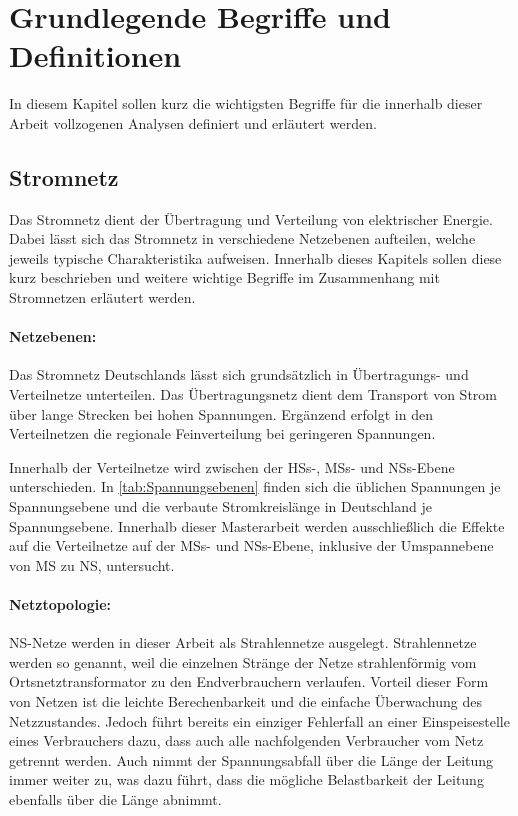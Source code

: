 \section{Grundlegende Begriffe und Definitionen}\label{chap:base_theo}

In diesem Kapitel sollen kurz die wichtigsten Begriffe für die innerhalb dieser Arbeit vollzogenen Analysen definiert und erläutert werden.


\subsection{Stromnetz}

Das Stromnetz dient der Übertragung und Verteilung von elektrischer Energie. \cite{Paschotta2020}
Dabei lässt sich das Stromnetz in verschiedene Netzebenen aufteilen, welche jeweils typische Charakteristika aufweisen.
Innerhalb dieses Kapitels sollen diese kurz beschrieben und weitere wichtige Begriffe im Zusammenhang mit Stromnetzen erläutert werden.


\paragraph{Netzebenen:}

Das Stromnetz Deutschlands lässt sich grundsätzlich in Übertragungs- und Verteilnetze unterteilen.
Das Übertragungsnetz dient dem Transport von Strom über lange Strecken bei hohen Spannungen.
Ergänzend erfolgt in den Verteilnetzen die regionale Feinverteilung bei geringeren Spannungen. \cite{Agora2019}\medskip

Innerhalb der Verteilnetze wird zwischen der \glspl{HS}-, \glspl{MS}- und \glspl{NS}-Ebene unterschieden.
In \autoref{tab:Spannungsebenen} finden sich die üblichen Spannungen je Spannungsebene und die verbaute Stromkreislänge in Deutschland je Spannungsebene.
Innerhalb dieser Masterarbeit werden ausschließlich die Effekte auf die Verteilnetze auf der \glspl{MS}- und \glspl{NS}-Ebene, inklusive der Umspannebene von \gls{MS} zu \gls{NS}, untersucht.




\paragraph{Netztopologie:}

\gls{NS}-Netze werden in dieser Arbeit als Strahlennetze ausgelegt.
Strahlennetze werden so genannt, weil die einzelnen Stränge der Netze strahlenförmig vom Ortsnetztransformator zu den Endverbrauchern verlaufen. \cite{Agora2019}
Vorteil dieser Form von Netzen ist die leichte Berechenbarkeit und die einfache Überwachung des Netzzustandes.
Jedoch führt bereits ein einziger Fehlerfall an einer Einspeisestelle eines Verbrauchers dazu, dass auch alle nachfolgenden Verbraucher vom Netz getrennt werden.
Auch nimmt der Spannungsabfall über die Länge der Leitung immer weiter zu, was dazu führt, dass die mögliche Belastbarkeit der Leitung ebenfalls über die Länge abnimmt. \cite{WNG2020}\medskip

